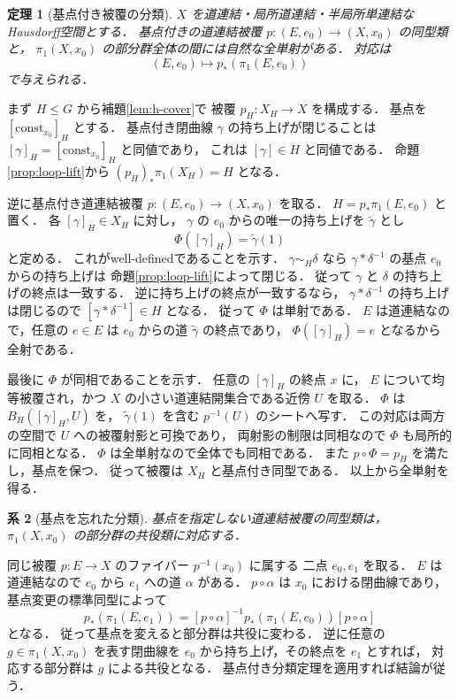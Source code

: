 \documentclass[a5paper,10pt,onecolumn]{jsarticle}
\makeatletter
\theoremstyle{mathnotetheorem}
\newtheorem{theorem}{定理}[section]
\newtheorem{corollary}[theorem]{系}
\renewcommand{\proofname}{証明}
\renewenvironment{proof}[1][\proofname]{%
  \par\pushQED{\qed}\normalfont\topsep4\p@\@plus2\p@\relax
  \trivlist\item[\hskip\labelsep\bfseries #1]\ignorespaces
}{\popQED\endtrivlist\@endpefalse}
\makeatother
\begin{document}
\begin{theorem}[基点付き被覆の分類]\label{thm:cover-class}
$X$ を道連結・局所道連結・半局所単連結なHausdorff空間とする．
基点付きの道連結被覆
$p:(E,e_0)\to(X,x_0)$ の同型類と，
$\pi_1(X,x_0)$ の部分群全体の間には自然な全単射がある．
対応は
\[
 (E,e_0)\longmapsto
 p_*(\pi_1(E,e_0))
\]
で与えられる．
\end{theorem}
\begin{proof}
まず $H\le G$ から補題\ref{lem:h-cover}で
被覆 $p_H:X_H\to X$ を構成する．
基点を $[\mathrm{const}_{x_0}]_H$ とする．
基点付き閉曲線 $\gamma$ の持ち上げが閉じることは
$[\gamma]_H=[\mathrm{const}_{x_0}]_H$ と同値であり，
これは $[\gamma]\in H$ と同値である．
命題\ref{prop:loop-lift}から
$(p_H)_*\pi_1(X_H)=H$ となる．

逆に基点付き道連結被覆
$p:(E,e_0)\to(X,x_0)$ を取る．
$H=p_*\pi_1(E,e_0)$ と置く．
各 $[\gamma]_H\in X_H$ に対し，
$\gamma$ の $e_0$ からの唯一の持ち上げを
$\widetilde\gamma$ とし
\[
 \Phi([\gamma]_H)=\widetilde\gamma(1)
\]
と定める．
これがwell-definedであることを示す．
$\gamma\sim_H\delta$ なら
$\gamma*\delta^{-1}$ の基点 $e_0$ からの持ち上げは
命題\ref{prop:loop-lift}によって閉じる．
従って $\gamma$ と $\delta$ の持ち上げの終点は一致する．
逆に持ち上げの終点が一致するなら，
$\gamma*\delta^{-1}$ の持ち上げは閉じるので
$[\gamma*\delta^{-1}]\in H$ となる．
従って $\Phi$ は単射である．
$E$ は道連結なので，任意の $e\in E$ は
$e_0$ からの道 $\widetilde\gamma$ の終点であり，
$\Phi([\gamma]_H)=e$ となるから全射である．

最後に $\Phi$ が同相であることを示す．
任意の $[\gamma]_H$ の終点 $x$ に，
$E$ について均等被覆され，かつ
$X$ の小さい道連結開集合である近傍 $U$ を取る．
$\Phi$ は $B_H([\gamma]_H,U)$ を，
$\widetilde\gamma(1)$ を含む $p^{-1}(U)$ のシートへ写す．
この対応は両方の空間で $U$ への被覆射影と可換であり，
両射影の制限は同相なので $\Phi$ も局所的に同相となる．
$\Phi$ は全単射なので全体でも同相である．
また $p\circ\Phi=p_H$ を満たし，基点を保つ．
従って被覆は $X_H$ と基点付き同型である．
以上から全単射を得る．
\end{proof}

\begin{corollary}[基点を忘れた分類]\label{cor:unbased}
基点を指定しない道連結被覆の同型類は，
$\pi_1(X,x_0)$ の部分群の共役類に対応する．
\end{corollary}
\begin{proof}
同じ被覆 $p:E\to X$ のファイバー $p^{-1}(x_0)$ に属する
二点 $e_0,e_1$ を取る．
$E$ は道連結なので $e_0$ から $e_1$ への道 $\alpha$ がある．
$p\circ\alpha$ は $x_0$ における閉曲線であり，
基点変更の標準同型によって
\[
 p_*(\pi_1(E,e_1))
 =[p\circ\alpha]^{-1}
 p_*(\pi_1(E,e_0))
 [p\circ\alpha]
\]
となる．
従って基点を変えると部分群は共役に変わる．
逆に任意の $g\in\pi_1(X,x_0)$ を表す閉曲線を
$e_0$ から持ち上げ，その終点を $e_1$ とすれば，
対応する部分群は $g$ による共役となる．
基点付き分類定理を適用すれば結論が従う．
\end{proof}
\end{document}
